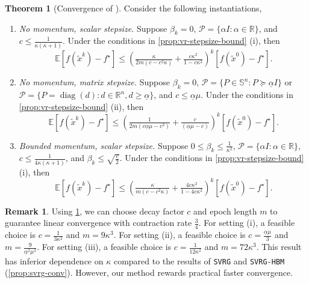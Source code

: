 \documentclass{article}
\theoremstyle{definition}
\newtheorem{theorem}{Theorem}[section]
\newtheorem{remark}[remark]{Remark}
\DeclareRobustCommand{\namerefc}[2]{\hyperref[#2]{\textcolor{#1}{\nameref*{#2}}}}
\newcommand{\ov}{\namerefc{purple}{alg:osgm-svrg}}
\newcommand{\svrg}{\texttt{SVRG}}
\newcommand{\sh}{\texttt{SVRG-HBM}}
\begin{document}
\begin{theorem}[Convergence of {\ov}]
  \label{thm:osgm-svrg}
  Consider the following instantiations,
  \begin{enumerate}
    \item \emph{No momentum, scalar stepsize.} Suppose $\beta_k=0$, $\mathcal{P} = \{ \alpha I : \alpha \in \mathbb{R} \}$, and $c \leq \tfrac{1}{\kappa (\kappa+ 1)}$. 
    Under the conditions in \cref{prop:vr-stepsize-bound} (i), then
    \[ \mathbb{E} [f (\tilde{x}^k) - f^{\star}] 
    \leq 
    \left( 
      \tfrac{\kappa}{2 m (c - c^2 \kappa)} + \tfrac{c\kappa^2}{1 - c \kappa^2}
    \right)^k 
    [f (\tilde{x}^0) - f^{\star}] . \]

    \item \emph{No momentum, matrix stepsize.} Suppose $\beta_k=0$, $\mathcal{P} = \{ P \in \mathbb{S}^{n}: P \succeq \underline{\alpha} I\}$ or $\mathcal{P} = \{P=\operatorname{diag}(d):d \in \mathbb{R}^n, d \geq \underline{\alpha}\}$, and $c \leq \underline{\alpha} \mu$. 
    Under the conditions in \cref{prop:vr-stepsize-bound} (ii), then
    \[ \mathbb{E} [f (\tilde{x}^k) - f^{\star}] \leq \left( 
      \tfrac{1}{2 m \left( c \underline{\alpha} \mu - c^2
     \right)} + \tfrac{c}{\left( \underline{\alpha} \mu - c \right)}
      \right)^k [f(\tilde{x}^0) - f^{\star}] . \]

    \item \emph{Bounded momentum, scalar stepsize.} Suppose $0 \leq \beta_k \leq \tfrac{1}{\kappa^2}$, $\mathcal{P} = \{ \alpha I : \alpha \in
    \mathbb{R} \}$, $c \leq \tfrac{1}{4 \kappa (\kappa + 1)}$,
    and ${\beta_k} \leq \sqrt{\tfrac{c}{2}}$. 
    Under the conditions in \cref{prop:vr-stepsize-bound} (i), then
    \[ \mathbb{E} [f (\tilde{x}^k) - f^{\star}] 
      \leq 
      \left( 
        \tfrac{\kappa}{m (c - c^2 \kappa)} + \tfrac{4 c \kappa^2}{1 - 4 c \kappa^2}
      \right)^k 
       [f (\tilde{x}^0) - f^{\star}]. \]
  \end{enumerate}
\end{theorem}

\begin{remark}
  Using \cref{thm:osgm-svrg}, we can choose decay factor $c$ and epoch length $m$ to guarantee linear convergence with contraction rate $\tfrac{3}{4}$.
  For setting (i), a feasible choice is $c = \tfrac{1}{3 \kappa^2}$ and $m =
  9 \kappa^3$.
  For setting (ii), a feasible choice is $c = \tfrac{\underline{\alpha} \mu}{3}$
  and $m = \tfrac{9}{\underline{\alpha}^2 \mu^2}$.
  For setting (iii), a feasible choice is $c = \tfrac{1}{12 \kappa^2}$ and $m = 72 \kappa^3$. 
  This result has inferior dependence on $\kappa$ compared to the results of {\svrg} and {\sh} (\cref{prop:svrg-conv}). 
  However, our method rewards practical faster convergence.
\end{remark}
\end{document}
